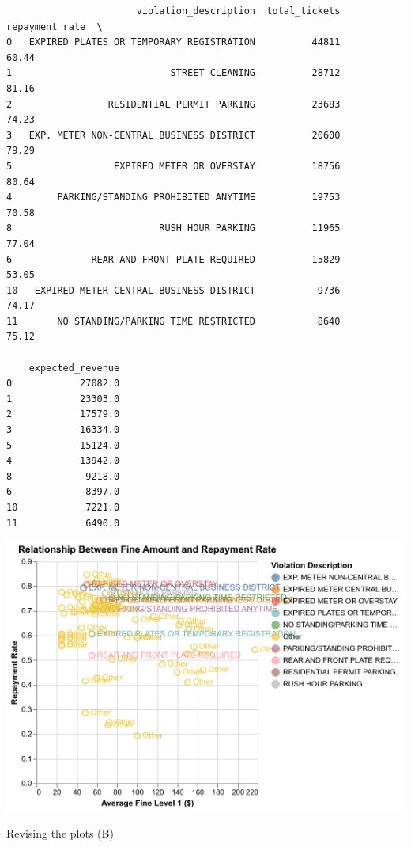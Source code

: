 \documentclass[
  letterpaper,
  DIV=11,
  numbers=noendperiod]{scrartcl}
\begin{document}
\begin{verbatim}
                       violation_description  total_tickets  repayment_rate  \
0   EXPIRED PLATES OR TEMPORARY REGISTRATION          44811           60.44   
1                            STREET CLEANING          28712           81.16   
2                 RESIDENTIAL PERMIT PARKING          23683           74.23   
3   EXP. METER NON-CENTRAL BUSINESS DISTRICT          20600           79.29   
5                  EXPIRED METER OR OVERSTAY          18756           80.64   
4        PARKING/STANDING PROHIBITED ANYTIME          19753           70.58   
8                          RUSH HOUR PARKING          11965           77.04   
6              REAR AND FRONT PLATE REQUIRED          15829           53.05   
10   EXPIRED METER CENTRAL BUSINESS DISTRICT           9736           74.17   
11       NO STANDING/PARKING TIME RESTRICTED           8640           75.12   

    expected_revenue  
0            27082.0  
1            23303.0  
2            17579.0  
3            16334.0  
5            15124.0  
4            13942.0  
8             9218.0  
6             8397.0  
10            7221.0  
11            6490.0  
\end{verbatim}

\includegraphics{ps2_final_files/figure-pdf/cell-26-output-2.png}

Revising the plots (B)
\end{document}
